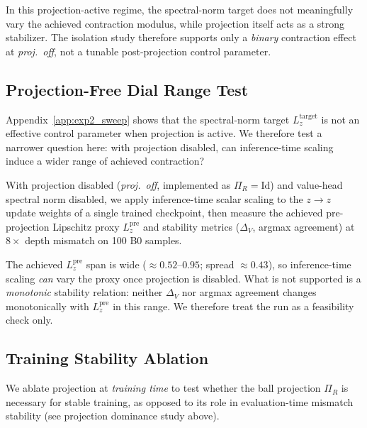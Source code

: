 \documentclass{article}
\theoremstyle{plain}
\theoremstyle{definition}
\theoremstyle{remark}
\begin{document}


In this projection-active regime, the spectral-norm target does not meaningfully vary the achieved contraction modulus, while projection itself acts as a strong stabilizer. The isolation study therefore supports only a \emph{binary} contraction effect at \emph{proj.\ off}, not a tunable post-projection control parameter.

\subsection{Projection-Free Dial Range Test}
\label{app:exp4_projection_free_dial}

Appendix~\ref{app:exp2_sweep} shows that the spectral-norm target $L_z^{\mathrm{target}}$ is not an effective control parameter when projection is active.
We therefore test a narrower question here: with projection disabled, can inference-time scaling induce a wider range of achieved contraction?

With projection disabled (\emph{proj.\ off}, implemented as $\Pi_R=\mathrm{Id}$) and value-head spectral norm disabled, we apply inference-time scalar scaling to the $z\!\to\!z$ update weights of a single trained checkpoint, then measure the achieved pre-projection Lipschitz proxy $L^{\mathrm{pre}}_z$ and stability metrics ($\Delta_V$, argmax agreement) at $8\times$ depth mismatch on 100 B0 samples.



The achieved $L^{\mathrm{pre}}_z$ span is wide ($\approx 0.52$--$0.95$; spread $\approx 0.43$), so inference-time scaling \emph{can} vary the proxy once projection is disabled. What is not supported is a \emph{monotonic} stability relation: neither $\Delta_V$ nor argmax agreement changes monotonically with $L^{\mathrm{pre}}_z$ in this range. We therefore treat the run as a feasibility check only.

\subsection{Training Stability Ablation}
\label{app:exp3_projection_ablation}

We ablate projection at \emph{training time} to test whether the ball projection $\Pi_R$ is necessary for stable training, as opposed to its role in evaluation-time mismatch stability (see projection dominance study above).
\end{document}
